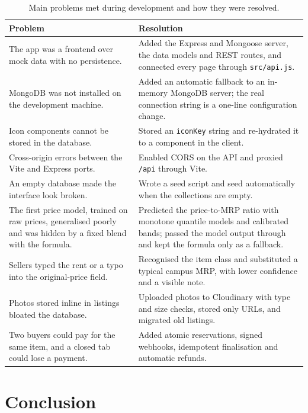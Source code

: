 \documentclass[12pt,letterpaper,twoside,openany]{report}
\newcommand{\code}[1]{\texttt{#1}}
\begin{document}
\begin{table}[htbp]
\centering
\caption{Main problems met during development and how they were resolved.}\label{tab:challenges}
\small
\begin{tabularx}{\textwidth}{@{}L{5.2cm}X@{}}
\toprule
\textbf{Problem} & \textbf{Resolution}\\
\midrule
The app was a frontend over mock data with no persistence. & Added the Express and Mongoose server, the data
models and REST routes, and connected every page through \code{src/api.js}.\\
MongoDB was not installed on the development machine. & Added an automatic fallback to an in-memory MongoDB
server; the real connection string is a one-line configuration change.\\
Icon components cannot be stored in the database. & Stored an \code{iconKey} string and re-hydrated it to a
component in the client.\\
Cross-origin errors between the Vite and Express ports. & Enabled CORS on the API and proxied \code{/api}
through Vite.\\
An empty database made the interface look broken. & Wrote a seed script and seed automatically when the
collections are empty.\\
The first price model, trained on raw prices, generalised poorly and was hidden by a fixed blend with the
formula. & Predicted the price-to-MRP ratio with monotone quantile models and calibrated bands; passed the
model output through and kept the formula only as a fallback.\\
Sellers typed the rent or a typo into the original-price field. & Recognised the item class and substituted
a typical campus MRP, with lower confidence and a visible note.\\
Photos stored inline in listings bloated the database. & Uploaded photos to Cloudinary with type and size checks,
stored only URLs, and migrated old listings.\\
Two buyers could pay for the same item, and a closed tab could lose a payment. & Added atomic reservations,
signed webhooks, idempotent finalisation and automatic refunds.\\
\bottomrule
\end{tabularx}
\end{table}

\chapter{Conclusion}\label{ch:conclusion}
\end{document}
